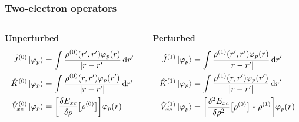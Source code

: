 \begin{frame}
    \frametitle{Two-electron operators}
    \begin{columns}
    \begin{column}[b]{0.4\linewidth}
    \centering
    \textbf{Unperturbed}
    \begin{align}
        \nonumber
        \hat{J}^{(0)} \ket{\varphi_p} &= \int\frac{\rho^{(0)}(r',r')\varphi_p(r)}{|r-r'|} \,\mathrm{d} r'\\
        \nonumber
        \hat{K}^{(0)} \ket{\varphi_p} &= \int\frac{\rho^{(0)}(r,r')\varphi_p(r')}{|r-r'|} \,\mathrm{d} r'\\
        \nonumber
        \hat{V}_{xc}^{(0)} \ket{\varphi_p} &= \bigg[\frac{\delta E_{xc}}{\delta\rho}\big[\rho^{(0)}\big]\bigg] \varphi_p(r) 
    \end{align}
    \end{column}
    \begin{column}[b]{0.6\linewidth}
    \centering
    \textbf{Perturbed}
    \begin{align}
        \nonumber
        \hat{J}^{(1)} \ket{\varphi_p} &= \int\frac{\rho^{(1)}(r',r')\varphi_p(r)}{|r-r'|} \,\mathrm{d} r'\\
        \nonumber
        \hat{K}^{(1)} \ket{\varphi_p} &= \int\frac{\rho^{(1)}(r,r')\varphi_p(r')}{|r-r'|} \,\mathrm{d} r'\\
        \nonumber
        \hat{V}_{xc}^{(1)} \ket{\varphi_p} &= \bigg[\frac{\delta^2 E_{xc}}{\delta
        \rho^2}\big[\rho^{(0)}\big]*\rho^{(1)}\bigg] \varphi_p(r) 
    \end{align}
    \end{column}
    \end{columns}

    \vspace{5mm}

\only<1>{
    \centering
    \textbf{Coulomb}
    \begin{equation}
        \nonumber
        \pert{\coulomb}{1} \ket{\orbital_p} = 
        \bigg[\int \frac{\pert{\rho}{1}(r',r')}{4\pi[r-r'|}\ud r'\bigg]\orbital_p(r)
    \end{equation}
}



\end{frame}

